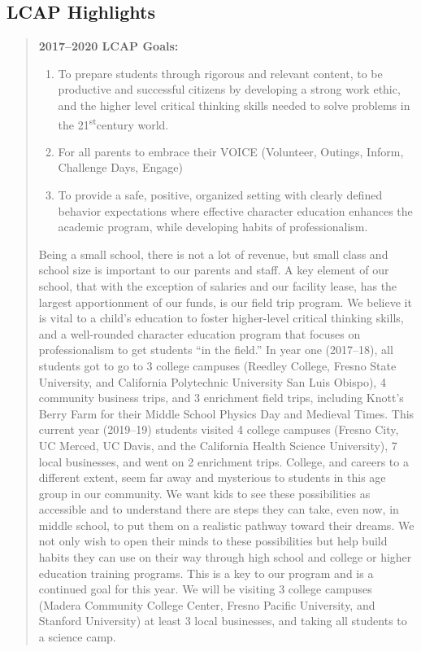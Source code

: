 \documentclass{article}
\newcommand{\st}{\textsuperscript{st}}
\newcounter{goal}[section]
\begin{document}
\subsection{LCAP Highlights}
\begin{quote}
	{\bf 2017--2020 LCAP Goals:}
	\begin{enumerate}
		\item To prepare students through rigorous and relevant content, to be productive and successful citizens by developing a strong work ethic, and the higher level critical thinking skills needed to solve problems in the 21\st century world.
		\item For all parents to embrace their VOICE (Volunteer, Outings, Inform, Challenge Days, Engage)
		\item To provide a safe, positive, organized setting with clearly defined behavior expectations where effective character education enhances the academic program, while developing habits of professionalism.
	\end{enumerate}
	Being a small school, there is not a lot of revenue, but small class and school size is important to our parents and staff. A key element of our school, that with the exception of salaries and our facility lease, has the largest apportionment of our funds, is our field trip program. We believe it is vital to a child's education to foster higher-level critical thinking skills, and a well-rounded character education program that focuses on professionalism to get students ``in the field.'' In year one (2017--18), all students got to go to 3 college campuses (Reedley College, Fresno State University, and California Polytechnic University San Luis Obispo), 4 community business trips, and 3 enrichment field trips, including Knott's Berry Farm for their Middle School Physics Day and Medieval Times. This current year (2019--19) students visited 4 college campuses (Fresno City, UC Merced, UC Davis, and the California Health Science University), 7 local businesses, and went on 2 enrichment trips. College, and careers to a different extent, seem far away and mysterious to students in this age group in our community. We want kids to see these possibilities as accessible and to understand there are steps they can take, even now, in middle school, to put them on a realistic pathway toward their dreams. We not only wish to open their minds to these possibilities but help build habits they can use on their way through high school and college or higher education training programs. This is a key to our program and is a continued goal for this year. We will be visiting 3 college campuses (Madera Community College Center, Fresno Pacific University, and Stanford University) at least 3 local businesses, and taking all students to a science camp.
\end{quote}
\end{document}
